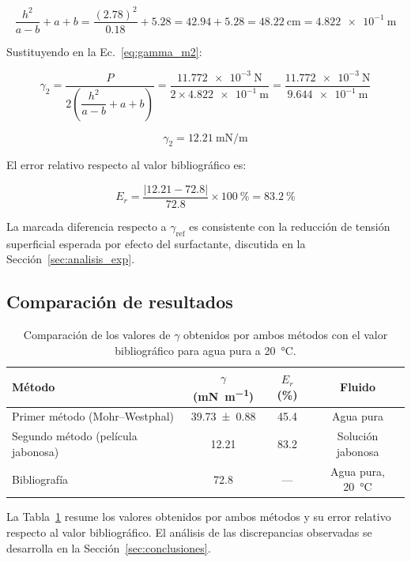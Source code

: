 \begin{equation*}
    \frac{h^2}{a - b} + a + b
    = \frac{(\num{2.78})^2}{\num{0.18}} + \num{5.28}
    = \num{42.94} + \num{5.28}
    = \qty{48.22}{\centi\meter}
    = \qty{4.822e-1}{\meter}
\end{equation*}

Sustituyendo en la Ec.~\eqref{eq:gamma_m2}:

\begin{equation*}
    \gamma_2
    = \frac{P}{2\!\left(\dfrac{h^2}{a-b} + a + b\right)}
    = \frac{\qty{11.772e-3}{\newton}}
           {2 \times \qty{4.822e-1}{\meter}}
    = \frac{\qty{11.772e-3}{\newton}}
           {\qty{9.644e-1}{\meter}}
\end{equation*}

\begin{equation}
    \boxed{\gamma_2 = \qty{12.21}{\milli\newton\per\meter}}
    \label{eq:t9_resultado_m2}
\end{equation}

El error relativo respecto al valor bibliográfico es:

\begin{equation*}
    E_r
    = \frac{|\num{12.21} - \num{72.8}|}{\num{72.8}} \times \qty{100}{\percent}
    = \qty{83.2}{\percent}
\end{equation*}

La marcada diferencia respecto a $\gamma_{\text{ref}}$ es consistente
con la reducción de tensión superficial esperada por efecto del
surfactante, discutida en la Sección~\ref{sec:analisis_exp}.

\subsection{Comparación de resultados}

\begin{table}[htbp]
\centering
\caption{Comparación de los valores de $\gamma$ obtenidos por ambos
métodos con el valor bibliográfico para agua pura a \SI{20}{\celsius}.}
\label{tab:t9_comparacion}
\begin{tabular}{lccc}
\toprule
Método &
$\gamma$ (\si{\milli\newton\per\meter}) &
$E_r$ (\si{\percent}) &
Fluido \\
\midrule
Primer método (Mohr--Westphal) &
    \num{39.73 \pm 0.88} & \num{45.4} & Agua pura \\
Segundo método (película jabonosa) &
    \num{12.21} & \num{83.2} & Solución jabonosa \\
Bibliografía \cite{serway,halliday} &
    \num{72.8} & --- & Agua pura, \SI{20}{\celsius} \\
\bottomrule
\end{tabular}
\end{table}

La Tabla~\ref{tab:t9_comparacion} resume los valores obtenidos por
ambos métodos y su error relativo respecto al valor bibliográfico. El
análisis de las discrepancias observadas se desarrolla en la
Sección~\ref{sec:conclusiones}.